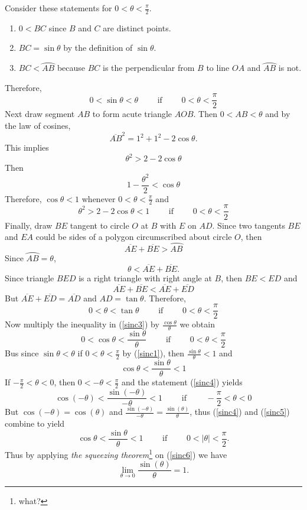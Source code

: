 \documentclass[11pt]{article}
\theoremstyle{definition}
\theoremstyle{plain}
\begin{document}
Consider these statements for $0<\theta<\frac\pi2$.
\begin{enumerate}
  \item $0<BC$ since $B$ and $C$ are distinct points.
  \item $BC=\sin \theta$ by the definition of $\sin \theta$.
  \item $BC<\wideparen{AB}$ because $BC$ is the perpendicular from $B$ to line $OA$ and $\wideparen{AB}$ is not.
\end{enumerate}
Therefore,
\begin{equation}\label{sinc1}
0<\sin\theta<\theta\qquad \mbox{ if } \qquad 0<\theta<\frac\pi2
\end{equation}
Next draw segment $AB$ to form acute triangle $AOB$. Then $0<AB<\theta$ and by the law of cosines,
\[
\overline{AB}^2=1^2+1^2-2\cos \theta.
\]
This implies
\[
\theta^2>2-2\cos\theta
\]
Then
\[
1-\frac{\theta^2}{2}<\cos\theta
\]
Therefore, $\cos\theta<1$ whenever $0<\theta<\frac\pi2$ and
\begin{equation}\label{sinc2}
\theta^2>2-2\cos\theta<1\qquad \mbox{ if } \qquad 0<\theta<\frac\pi2
\end{equation}
Finally, draw $BE$ tangent to circle $O$ at $B$ with $E$ on $AD$. Since two tangents $BE$ and $EA$ could be sides of a polygon circumscribed about circle $O$, then
\[
\overline{AE}+\overline{BE}>\wideparen{AB}
\]
Since $\wideparen{AB}=\theta$,
\[
\theta<\overline{AE}+\overline{BE}.
\]
Since triangle $BED$ is a right triangle with right angle at $B$, then $BE<ED$ and
\[
\overline{AE}+\overline{BE}<\overline{AE}+\overline{ED}
\]
But $\overline{AE}+\overline{ED}=\overline{AD}$ and $AD=\tan \theta$. Therefore,
\begin{equation}\label{sinc3}
0<\theta<\tan \theta\qquad \mbox{ if } \qquad 0<\theta<\frac\pi2
\end{equation}
Now multiply the inequality in (\ref{sinc3}) by $\displaystyle\frac{\cos\theta}{\theta}$ we obtain
\[
0<\cos\theta<\frac{\sin\theta}{\theta}\qquad \mbox{ if } \qquad 0<\theta<\frac\pi2
\]
Bus since $\sin\theta<\theta$ if $0<\theta<\frac\pi2$ by (\ref{sinc1}), then $\displaystyle\frac{\sin\theta}{\theta}<1$ and
\begin{equation}\label{sinc4}
\cos\theta<\frac{\sin\theta}{\theta}<1
\end{equation}
If $-\frac\pi2<\theta<0$, then $0<-\theta<\frac\pi2$ and the statement (\ref{sinc4}) yields
\begin{equation}\label{sinc5}
\cos(-\theta)<\frac{\sin(-\theta)}{-\theta}<1\qquad \mbox{ if } \qquad -\frac\pi2<\theta<0
\end{equation}
But $\cos(-\theta)=\cos(\theta)$ and $\displaystyle\frac{\sin(-\theta)}{-\theta}=\frac{\sin(\theta)}{\theta}$, thus (\ref{sinc4}) and (\ref{sinc5}) combine to yield
\begin{equation}\label{sinc6}
\cos\theta<\frac{\sin\theta}{\theta}<1\qquad \mbox{ if } \qquad 0<|\theta|<\frac\pi2.
\end{equation}
Thus by applying \textit{the squeezing theorem}\footnote{what?} on (\ref{sinc6}) we have
\[
\lim_{\theta\to 0}\frac{\sin(\theta)}{\theta}=1.
\]
\end{document}
